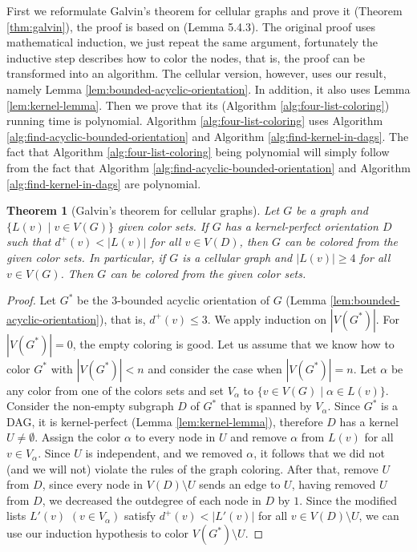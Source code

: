\documentclass[letterpaper, 10 pt, conference]{ieeeconf}  %
\newtheorem{thm}{Theorem}
\begin{document}
First we reformulate Galvin's theorem for cellular graphs and prove it (Theorem \ref{thm:galvin}), the proof is based on \cite{citeulike:395714} (Lemma 5.4.3). The original proof uses mathematical induction, we just repeat the same argument, fortunately the inductive step describes how to color the nodes, that is, the proof can be transformed into an algorithm. The cellular version, however, uses our result, namely Lemma \ref{lem:bounded-acyclic-orientation}. In addition, it also uses Lemma \ref{lem:kernel-lemma}. Then we prove that its (Algorithm \ref{alg:four-list-coloring}) running time is polynomial. Algorithm \ref{alg:four-list-coloring} uses Algorithm \ref{alg:find-acyclic-bounded-orientation} and Algorithm \ref{alg:find-kernel-in-dags}. The fact that Algorithm \ref{alg:four-list-coloring} being polynomial will simply follow from the fact that Algorithm \ref{alg:find-acyclic-bounded-orientation} and Algorithm \ref{alg:find-kernel-in-dags} are polynomial.
\begin{thm}[Galvin's theorem for cellular graphs] Let $G$ be a graph and $\lbrace L(v) \mid v \in V(G) \rbrace$ given color sets. If $G$ has a kernel-perfect orientation $D$ such that $d^+(v) < |L(v)|$ for all $v \in V(D)$, then $G$ can be colored from the given color sets.
In particular, if $G$ is a cellular graph and $|L(v)| \geqslant 4$ for all $v \in V(G)$. Then $G$ can be colored from the given color sets.
\end{thm}
\begin{proof}
Let $G^*$ be the $3$-bounded acyclic orientation of $G$ (Lemma \ref{lem:bounded-acyclic-orientation}), that is, $d^+(v) \leqslant 3$. We apply induction on $|V(G^*)|$. For $|V(G^*)|=0$, the empty coloring is good. Let us assume that we know how to color $G^*$ with $|V(G^*)| < n$ and consider the case when $|V(G^*)|=n$. Let $\alpha$ be any color from one of the colors sets and set $V_\alpha$ to $\lbrace v \in V(G) \mid \alpha \in L(v) \rbrace$. Consider the non-empty subgraph $D$ of $G^*$ that is spanned by $V_\alpha$. Since $G^*$ is a DAG, it is kernel-perfect (Lemma \ref{lem:kernel-lemma}), therefore $D$ has a kernel $U \neq \emptyset$. Assign the color $\alpha$ to every node in $U$ and remove $\alpha$ from $L(v)$ for all $v \in V_\alpha$. Since $U$ is independent, and we removed $\alpha$, it follows that we did not (and we will not) violate the rules of the graph coloring. After that, remove $U$ from $D$, since every node in $V(D) \setminus U$ sends an edge to $U$, having removed $U$ from $D$, we decreased the outdegree of each node in $D$ by $1$. Since the modified lists $L'(v)$ $(v \in V_\alpha)$ satisfy $d^+(v) < |L'(v)|$ for all $v \in V(D) \setminus U$, we can use our induction hypothesis to color $V(G^*) \setminus U$.
\end{proof}
\end{document}
